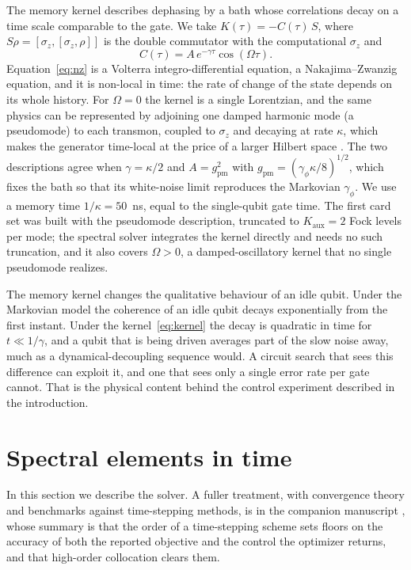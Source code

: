 \documentclass[10pt]{article}
\begin{document}
The memory kernel describes dephasing by a bath whose correlations decay on a
time scale comparable to the gate. We take $K(\tau) = -C(\tau)\, S$, where
$S\rho = [\sigma_z,[\sigma_z,\rho]]$ is the double commutator with the
computational $\sigma_z$ and
\begin{equation}
  C(\tau) = A\, e^{-\gamma\tau} \cos(\Omega\tau).
  \label{eq:kernel}
\end{equation}
Equation~\eqref{eq:nz} is a Volterra integro-differential equation, a
Nakajima--Zwanzig equation, and it is non-local in time: the rate of change of
the state depends on its whole history. For $\Omega = 0$ the kernel is a single
Lorentzian, and the same physics can be represented by adjoining one damped
harmonic mode (a pseudomode) to each transmon, coupled to $\sigma_z$ and
decaying at rate $\kappa$, which makes the generator time-local at the price of
a larger Hilbert space \cite{Tamascelli2018}. The two descriptions agree when
$\gamma = \kappa/2$ and $A = g_{\mathrm{pm}}^2$ with
$g_{\mathrm{pm}} = (\gamma_\phi\kappa/8)^{1/2}$, which fixes the bath so that
its white-noise limit reproduces the Markovian $\gamma_\phi$. We use a memory
time $1/\kappa = 50$~ns, equal to the single-qubit gate time. The first card
set was built with the pseudomode description, truncated to $K_{\mathrm{aux}} = 2$
Fock levels per mode; the spectral solver integrates the kernel directly and
needs no such truncation, and it also covers $\Omega > 0$, a damped-oscillatory
kernel that no single pseudomode realizes.

The memory kernel changes the qualitative behaviour of an idle qubit. Under
the Markovian model the coherence of an idle qubit decays exponentially from
the first instant. Under the kernel~\eqref{eq:kernel} the decay is quadratic in
time for $t \ll 1/\gamma$, and a qubit that is being driven averages part of
the slow noise away, much as a dynamical-decoupling sequence would. A circuit
search that sees this difference can exploit it, and one that sees only a
single error rate per gate cannot. That is the physical content behind the
control experiment described in the introduction.

\section{Spectral elements in time}
\label{sec:sem}

In this section we describe the solver. A fuller treatment, with convergence
theory and benchmarks against time-stepping methods, is in the companion
manuscript \cite{VogtSISC}, whose summary is that the order of a time-stepping
scheme sets floors on the accuracy of both the reported objective and the
control the optimizer returns, and that high-order collocation clears them.
\end{document}
